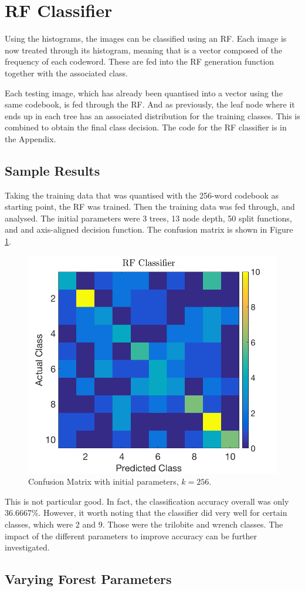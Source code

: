 \documentclass[a4paper, 10pt, conference]{ieeeconf}
\begin{document}
\section{RF Classifier}
Using the histograms, the images can be classified using an RF. Each image is now treated through its histogram, meaning that is a vector composed of the frequency of each codeword. These are fed into the RF generation function together with the associated class.

Each testing image, which has already been quantised into a vector using the same codebook, is fed through the RF. And as previously, the leaf node where it ends up in each tree has an associated distribution for the training classes. This is combined to obtain the final class decision. The code for the RF classifier is in the Appendix.

\subsection{Sample Results}
Taking the training data that was quantised with the 256-word codebook as starting point, the RF was trained. Then the training data was fed through, and analysed. The initial parameters were 3 trees, 13 node depth, 50 split functions, and and axis-aligned decision function. The confusion matrix is shown in Figure \ref{fig:rfclassifier}.
\begin{figure}[H]
    \centering
    \includegraphics[width=0.45\linewidth]{img/rfclassifier}
    \caption{Confusion Matrix with initial parameters, $k = 256$.}
    \label{fig:rfclassifier}
\end{figure}
This is not particular good. In fact, the classification accuracy overall was only 36.6667\%. However, it worth noting that the classifier did very well for certain classes, which were 2 and 9. Those were the trilobite and wrench classes. The impact of the different parameters to improve accuracy can be further investigated.

\subsection{Varying Forest Parameters}
\end{document}

